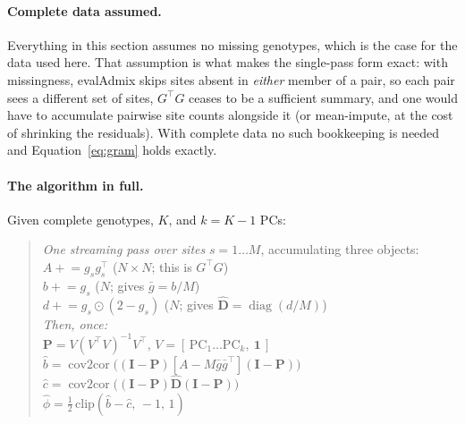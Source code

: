 \documentclass[10pt,a4paper]{article}
\begin{document}
\paragraph{Complete data assumed.} Everything in this section assumes no missing genotypes, which is the
case for the data used here. That assumption is what makes the single-pass form exact: with missingness,
evalAdmix skips sites absent in \emph{either} member of a pair, so each pair sees a different set of sites,
$G^{\!\top}G$ ceases to be a sufficient summary, and one would have to accumulate pairwise site counts
alongside it (or mean-impute, at the cost of shrinking the residuals). With complete data no such bookkeeping
is needed and Equation~\eqref{eq:gram} holds exactly.

\paragraph{The algorithm in full.} Given complete genotypes, $K$, and $k=K-1$ PCs:

\begin{quote}\small
\emph{One streaming pass over sites} $s=1\ldots M$, accumulating three objects:\\[2pt]
\hspace*{1em}$A \mathrel{+}= g_s g_s^{\!\top}$ \hfill ($N\times N$; this is $G^{\!\top}G$)\\
\hspace*{1em}$b \mathrel{+}= g_s$ \hfill ($N$; gives $\bar g = b/M$)\\
\hspace*{1em}$d \mathrel{+}= g_s\odot(2-g_s)$ \hfill ($N$; gives $\hat{\mathbf D}=\operatorname{diag}(d/M)$)\\[4pt]
\emph{Then, once:}\\
\hspace*{1em}$\mathbf{P} = V(V^{\!\top}V)^{-1}V^{\!\top}$, \quad $V=[\,\mathrm{PC}_1\ldots\mathrm{PC}_k,\ \mathbf 1\,]$\\
\hspace*{1em}$\hat b = \operatorname{cov2cor}\!\big((\mathbf I-\mathbf P)[A-M\bar g\bar g^{\!\top}](\mathbf I-\mathbf P)\big)$\\
\hspace*{1em}$\hat c = \operatorname{cov2cor}\!\big((\mathbf I-\mathbf P)\hat{\mathbf D}(\mathbf I-\mathbf P)\big)$\\
\hspace*{1em}$\hat\phi = \tfrac12\,\mathrm{clip}(\hat b-\hat c,\,-1,\,1)$
\end{quote}
\end{document}
